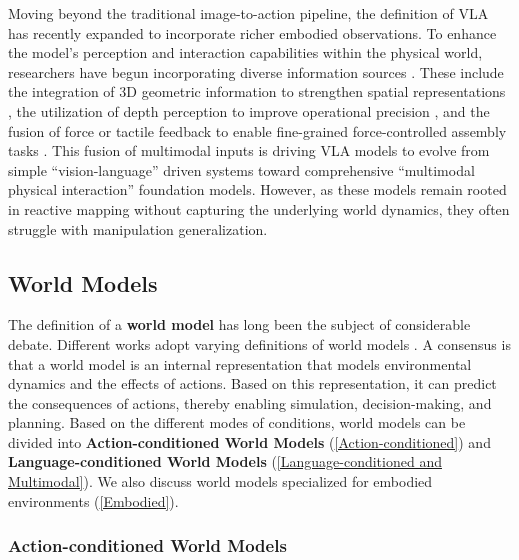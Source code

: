 Moving beyond the traditional image-to-action pipeline, the definition of VLA has recently expanded to incorporate richer embodied observations.
To enhance the model's perception and interaction capabilities within the physical world, researchers have begun incorporating diverse information sources \cite{OmniAction, FuSe}. These include the integration of 3D geometric information to strengthen spatial representations \cite{3D-VLA}, the utilization of depth perception to improve operational precision \cite{DepthVLA}, and the fusion of force or tactile feedback to enable fine-grained force-controlled assembly tasks \cite{TA-VLA, Tactile-VLA}. This fusion of multimodal inputs is driving VLA models to evolve from simple ``vision-language'' driven systems toward comprehensive ``multimodal physical interaction'' foundation models. However, as these models remain rooted in reactive mapping without capturing the underlying world dynamics, they often struggle with manipulation generalization.




\subsection{World Models}

The definition of a \textbf{world model} has long been the subject of considerable debate. Different works adopt varying definitions of world models \cite{World_Model_Def_1, Sora_simulation, Beyond_World_Models, A_Step_Toward_World_models, WorldModels, lecun2022path}. A consensus is that a world model is an internal representation that models environmental dynamics and the effects of actions. Based on this representation, it can predict the consequences of actions, thereby enabling simulation, decision-making, and planning. Based on the different modes of conditions, world models can be divided into \textbf{Action-conditioned World Models} (\autoref{Action-conditioned}) and \textbf{Language-conditioned World Models} (\autoref{Language-conditioned and Multimodal}). We also discuss world models specialized for embodied environments (\autoref{Embodied}).

\subsubsection{Action-conditioned World Models} 
\label{Action-conditioned}

